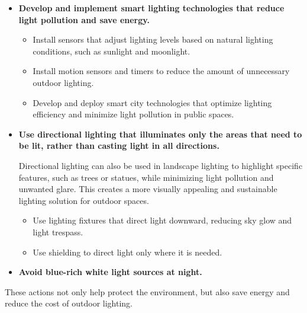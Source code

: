 \begin{itemize}
    
    \item \textbf{Develop and implement smart lighting technologies that reduce light pollution and save energy.}
    \begin{itemize}
        \item Install sensors that adjust lighting levels based on natural lighting conditions, such as sunlight and moonlight. 
        \item Install motion sensors and timers to reduce the amount of unnecessary outdoor lighting.
        
        \item Develop and deploy smart city technologies that optimize lighting efficiency and minimize light pollution in public spaces.
    \end{itemize}

    \item \textbf{Use directional lighting that illuminates only the areas that need to be lit, rather than casting light in all directions.}

    Directional lighting can also be used in landscape lighting to highlight specific features, such as trees or statues, while minimizing light pollution and unwanted glare. This creates a more visually appealing and sustainable lighting solution for outdoor spaces.

    \begin{itemize}
        \item Use lighting fixtures that direct light downward, reducing sky glow and light trespass.
        \item Use shielding to direct light only where it is needed.
    \end{itemize}

    \item \textbf{Avoid blue-rich white light sources at night. }


\end{itemize}

These actions not only help protect the environment, but also save energy and reduce the cost of outdoor lighting.

